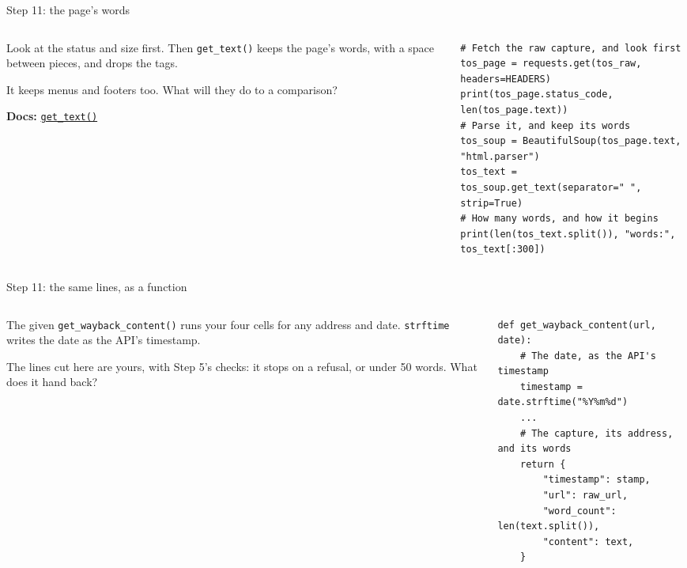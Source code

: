 \documentclass[9pt,aspectratio=169]{beamer}
\begin{document}
\begin{frame}[fragile]{Step 11: the page's words}
    \begin{columns}[T]
        \begin{column}{0.37\textwidth}
            Look at the status and size first. Then \texttt{get\_text()} keeps the page's words, with a space between pieces, and drops the tags.

            \medskip
            It keeps menus and footers too. What will they do to a comparison?

            \medskip
            {\scriptsize\textbf{Docs:} \href{https://www.crummy.com/software/BeautifulSoup/bs4/doc/\#get-text}{\texttt{get\_text()}}\par}
        \end{column}
        \begin{column}{0.6\textwidth}
\begin{lstlisting}
# Fetch the raw capture, and look first
tos_page = requests.get(tos_raw, headers=HEADERS)
print(tos_page.status_code, len(tos_page.text))
# Parse it, and keep its words
tos_soup = BeautifulSoup(tos_page.text, "html.parser")
tos_text = tos_soup.get_text(separator=" ", strip=True)
# How many words, and how it begins
print(len(tos_text.split()), "words:", tos_text[:300])
\end{lstlisting}
        \end{column}
    \end{columns}
\end{frame}

\begin{frame}[fragile]{Step 11: the same lines, as a function}
    \begin{columns}[T]
        \begin{column}{0.37\textwidth}
            The given \texttt{get\_wayback\_content()} runs your four cells for any address and date. \texttt{strftime} writes the date as the API's timestamp.

            \medskip
            The lines cut here are yours, with Step 5's checks: it stops on a refusal, or under 50 words. What does it hand back?
        \end{column}
        \begin{column}{0.6\textwidth}
\begin{lstlisting}
def get_wayback_content(url, date):
    # The date, as the API's timestamp
    timestamp = date.strftime("%Y%m%d")
    ...
    # The capture, its address, and its words
    return {
        "timestamp": stamp,
        "url": raw_url,
        "word_count": len(text.split()),
        "content": text,
    }
\end{lstlisting}
        \end{column}
    \end{columns}
\end{frame}
\end{document}
